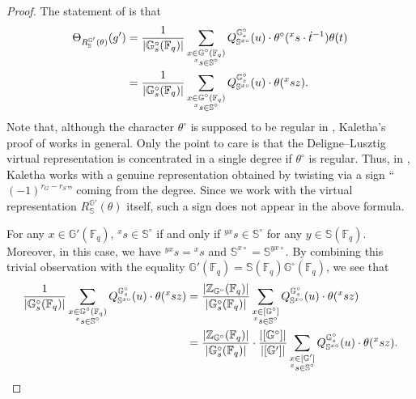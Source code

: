 \documentclass{amsart}
\newcommand{\F}{\mathbb{F}}
\newcommand{\bbS}{\mathbb{S}}
\newcommand{\bbG}{\mathbb{G}}
\newcommand{\bbZ}{\mathbb{Z}}
\theoremstyle{plain}
\theoremstyle{definition}
\theoremstyle{remark}
\theoremstyle{theorem}
\begin{document}
\begin{proof}
The statement of \cite[Proposition 3.4.24]{Kal19} is that
\begin{align*}
\Theta_{R_{\bbS}^{\bbG'}(\theta)}(g')
&=
\frac{1}{|\bbG^{\circ}_{s}(\F_{q})|}
\sum_{\begin{subarray}{c}x\in \bbG^{\circ}(\F_{q}) \\ {}^{x}s\in\bbS^{\circ}\end{subarray}}
Q^{\bbG^{\circ}_{s}}_{\bbS^{x\circ}}(u)\cdot \theta^{\circ}({}^{x}s\cdot\dot{t}^{-1})\theta(t)\\
&=
\frac{1}{|\bbG^{\circ}_{s}(\F_{q})|}
\sum_{\begin{subarray}{c}x\in \bbG^{\circ}(\F_{q}) \\ {}^{x}s\in\bbS^{\circ}\end{subarray}}
Q^{\bbG^{\circ}_{s}}_{\bbS^{x\circ}}(u)\cdot \theta({}^{x}sz).
\end{align*}
Note that, although the character $\theta^{\circ}$ is supposed to be regular in \cite{Kal19}, Kaletha's proof of \cite[Proposition 3.4.24]{Kal19} works in general.
Only the point to care is that the Deligne--Lusztig virtual representation is concentrated in a single degree if $\theta^{\circ}$ is regular.
Thus, in \cite[Proposition 3.4.24]{Kal19}, Kaletha works with a genuine representation obtained by twisting via a sign ``$(-1)^{r_{G}-r_{S}}$'' coming from the degree.
Since we work with the virtual representation $R^{\bbG'}_{\bbS}(\theta)$ itself, such a sign does not appear in the above formula.

For any $x\in\bbG'(\F_{q})$, ${}^{x}s\in\bbS^{\circ}$ if and only if ${}^{yx}s\in\bbS^{\circ}$ for any $y\in\bbS(\F_{q})$.
Moreover, in this case, we have ${}^{yx}s={}^{x}s$ and $\bbS^{x\circ}=\bbS^{yx\circ}$.
By combining this trivial observation with the equality $\bbG'(\F_{q})=\bbS(\F_{q})\bbG^{\circ}(\F_{q})$, we see that
\begin{align*}
\frac{1}{|\bbG^{\circ}_{s}(\F_{q})|}
\sum_{\begin{subarray}{c}x\in \bbG^{\circ}(\F_{q}) \\ {}^{x}s\in\bbS^{\circ}\end{subarray}}
Q^{\bbG^{\circ}_{s}}_{\bbS^{x\circ}}(u)\cdot \theta({}^{x}sz)
&=\frac{|\bbZ_{\bbG^{\circ}}(\F_{q})|}{|\bbG^{\circ}_{s}(\F_{q})|}
\sum_{\begin{subarray}{c}x\in [\bbG^{\circ}] \\ {}^{x}s\in\bbS^{\circ}\end{subarray}}
Q^{\bbG^{\circ}_{s}}_{\bbS^{x\circ}}(u)\cdot \theta({}^{x}sz)\\
&=\frac{|\bbZ_{\bbG^{\circ}}(\F_{q})|}{|\bbG^{\circ}_{s}(\F_{q})|}
\cdot\frac{|[\bbG^{\circ}]|}{|[\bbG']|}
\sum_{\begin{subarray}{c}x\in [\bbG'] \\ {}^{x}s\in\bbS^{\circ}\end{subarray}}
Q^{\bbG^{\circ}_{s}}_{\bbS^{x\circ}}(u)\cdot \theta({}^{x}sz).\qedhere
\end{align*}
\end{proof}
\end{document}
